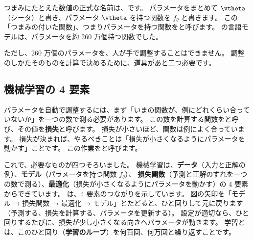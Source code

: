 つまみにたとえた数値の正式な名前は、です。
パラメータをまとめて $\vtheta$（シータ）と書き、パラメータ $\vtheta$ を持つ関数を $f_\theta$ と書きます。
この「つまみの付いた関数」、つまりパラメータを持つ関数をと呼びます。
の言語モデルは、パラメータを約 260 万個持つ関数でした。

ただし、260 万個のパラメータを、人が手で調整することはできません。
調整のしかたそのものを計算で決めるために、道具があと二つ必要です。

\subsection*{機械学習の 4 要素}

パラメータを自動で調整するには、まず「いまの関数が、例にどれくらい合っていないか」を一つの数で測る必要があります。
この数を計算する関数をと呼び、その値を\textbf{損失}と呼びます。
損失が小さいほど、関数は例によく合っています。
損失が決まれば、やるべきことは「損失が小さくなるようにパラメータを動かす」ことです。
この作業をと呼びます。

これで、必要なものが四つそろいました。
機械学習は、\textbf{データ}（入力と正解の例）、\textbf{モデル}（パラメータを持つ関数 $f_\theta$）、
\textbf{損失関数}（予測と正解のずれを一つの数で測る）、\textbf{最適化}（損失が小さくなるようにパラメータを動かす）の 4 要素からできています。
は、4 要素のつながりを示しています。
図の矢印を「モデル → 損失関数 → 最適化 → モデル」とたどると、ひと回りして元に戻ります（予測する、損失を計算する、パラメータを更新する）。
設定が適切なら、ひと回りするたびに、損失が少し小さくなる向きへパラメータが動きます。
学習とは、このひと回り（\textbf{学習のループ}）を何百回、何万回と繰り返すことです。

